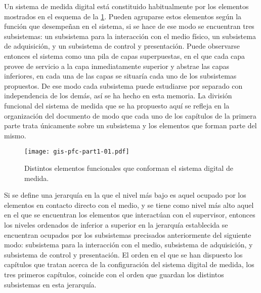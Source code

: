 Un sistema de medida digital está constituido habitualmente por los
elementos mostrados en el esquema de la \cref{fig:digmeasstm}. Pueden
agruparse estos elementos según la función que desempeñan en el sistema, si
se hace de ese modo se encuentran tres subsistemas: un subsistema para la
interacción con el medio físico, un subsistema de adquisición, y un
subsistema de control y presentación. Puede observarse entonces el sistema
como una pila de capas superpuestas, en el que cada capa provee de servicio
a la capa inmediatamente superior y abstrae las capas inferiores, en cada
una de las capas se situaría cada uno de los subsistemas propuestos. De ese
modo cada subsistema puede estudiarse por separado con independencia de los
demás, así se ha hecho en esta memoria. La división funcional del sistema
de medida que se ha propuesto aquí se refleja en la organización del
documento de modo que cada uno de los capítulos de la primera parte trata
únicamente sobre un subsistema y los elementos que forman parte del mismo.

\begin{figure}
	\begin{center}
		\texttt{[image: gis-pfc-part1-01.pdf]}
	\end{center}
	\captionsetup{listformat=romanos, labelformat=romanos}
	\caption[Sistema de medida digital]{Distintos elementos funcionales
	que conforman el sistema digital de medida.}
	\label{fig:digmeasstm}
\end{figure}

\llongpage{}
Si se define una jerarquía en la que el nivel más bajo es aquel ocupado por
los elementos en contacto directo con el medio, y se tiene como nivel más
alto aquel en el que se encuentran los elementos que interactúan con el
supervisor, entonces los niveles ordenados de inferior a superior en la
jerarquía establecida se encuentran ocupados por los subsistemas precisados
anteriormente del siguiente modo: subsistema para la interacción con el
medio, subsistema de adquisición, y subsistema de control y presentación.
El orden en el que se han dispuesto los capítulos que tratan acerca de la
configuración del sistema digital de medida, los tres primeros capítulos,
coincide con el orden que guardan los distintos subsistemas en esta
jerarquía.
